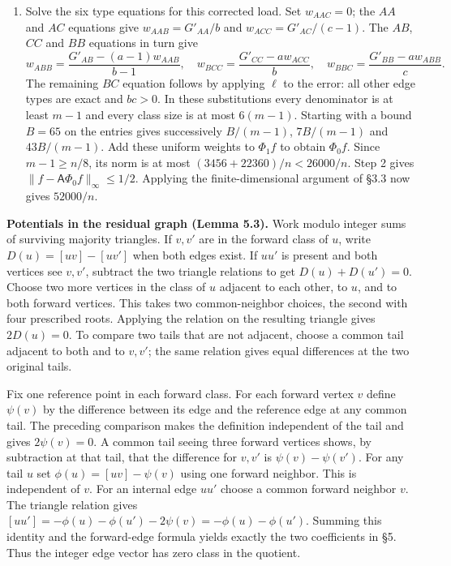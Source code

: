 \documentclass[english,11pt,a4paper]{article}
\begin{document}
\begin{enumerate}
\item
  Solve the six type equations for this corrected load. Set \(w_{AAC}=0\); the \(AA\) and \(AC\) equations give \(w_{AAB}=G'_{AA}/b\) and \(w_{ACC}=G'_{AC}/(c-1)\). The \(AB\), \(CC\) and \(BB\) equations in turn give \[w_{ABB}=\frac{G'_{AB}-(a-1)w_{AAB}}{b-1},\quad
   w_{BCC}=\frac{G'_{CC}-a w_{ACC}}b,\quad
   w_{BBC}=\frac{G'_{BB}-a w_{ABB}}c .\] The remaining \(BC\) equation follows by applying \(\ell\) to the error: all other edge types are exact and \(bc>0\). In these substitutions every denominator is at least \(m-1\) and every class size is at most \(6(m-1)\). Starting with a bound \(B=65\) on the entries gives successively \(B/(m-1)\), \(7B/(m-1)\) and \(43B/(m-1)\). Add these uniform weights to \(\Phi_1 f\) to obtain \(\Phi_0 f\). Since \(m-1\ge n/8\), its norm is at most \((3456+22360)/n<26000/n\). Step 2 gives \(\|f-\mathsf A\Phi_0 f\|_\infty\le1/2\). Applying the finite-dimensional argument of §3.3 now gives \(52000/n\).
\end{enumerate}

\textbf{Potentials in the residual graph (Lemma 5.3).} Work modulo integer sums of surviving majority triangles. If \(v,v'\) are in the forward class of \(u\), write \(D(u)=[uv]-[uv']\) when both edges exist. If \(uu'\) is present and both vertices see \(v,v'\), subtract the two triangle relations to get \(D(u)+D(u')=0\). Choose two more vertices in the class of \(u\) adjacent to each other, to \(u\), and to both forward vertices. This takes two common-neighbor choices, the second with four prescribed roots. Applying the relation on the resulting triangle gives \(2D(u)=0\). To compare two tails that are not adjacent, choose a common tail adjacent to both and to \(v,v'\); the same relation gives equal differences at the two original tails.

Fix one reference point in each forward class. For each forward vertex \(v\) define \(\psi(v)\) by the difference between its edge and the reference edge at any common tail. The preceding comparison makes the definition independent of the tail and gives \(2\psi(v)=0\). A common tail seeing three forward vertices shows, by subtraction at that tail, that the difference for \(v,v'\) is \(\psi(v)-\psi(v')\). For any tail \(u\) set \(\phi(u)=[uv]-\psi(v)\) using one forward neighbor. This is independent of \(v\). For an internal edge \(uu'\) choose a common forward neighbor \(v\). The triangle relation gives \([uu']=-\phi(u)-\phi(u')-2\psi(v)=-\phi(u)-\phi(u')\). Summing this identity and the forward-edge formula yields exactly the two coefficients in §5. Thus the integer edge vector has zero class in the quotient.
\end{document}
